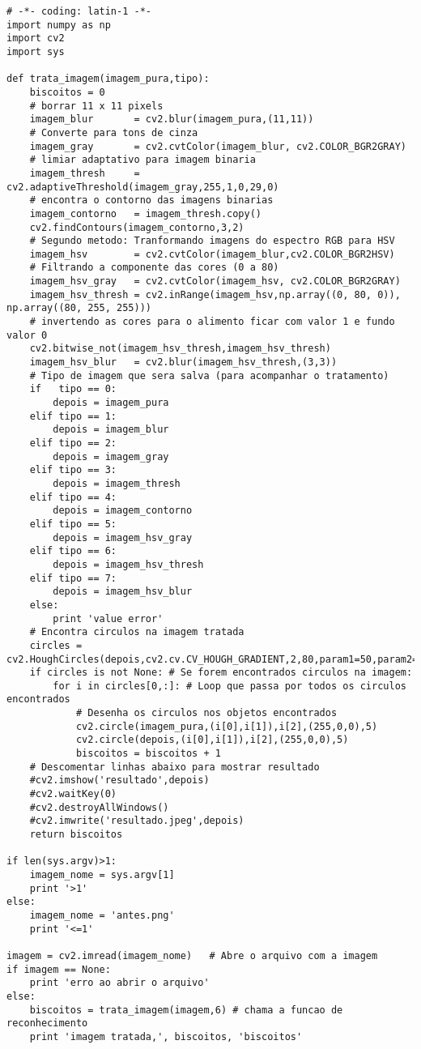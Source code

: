 \lstset{language=Python}
\begin{lstlisting}
# -*- coding: latin-1 -*-
import numpy as np
import cv2
import sys

def trata_imagem(imagem_pura,tipo):
    biscoitos = 0
    # borrar 11 x 11 pixels 
    imagem_blur       = cv2.blur(imagem_pura,(11,11)) 
    # Converte para tons de cinza
    imagem_gray       = cv2.cvtColor(imagem_blur, cv2.COLOR_BGR2GRAY) 
    # limiar adaptativo para imagem binaria
    imagem_thresh     = cv2.adaptiveThreshold(imagem_gray,255,1,0,29,0)
    # encontra o contorno das imagens binarias
    imagem_contorno   = imagem_thresh.copy()
    cv2.findContours(imagem_contorno,3,2)
    # Segundo metodo: Tranformando imagens do espectro RGB para HSV
    imagem_hsv        = cv2.cvtColor(imagem_blur,cv2.COLOR_BGR2HSV)
    # Filtrando a componente das cores (0 a 80)
    imagem_hsv_gray   = cv2.cvtColor(imagem_hsv, cv2.COLOR_BGR2GRAY)
    imagem_hsv_thresh = cv2.inRange(imagem_hsv,np.array((0, 80, 0)), np.array((80, 255, 255)))
    # invertendo as cores para o alimento ficar com valor 1 e fundo valor 0
    cv2.bitwise_not(imagem_hsv_thresh,imagem_hsv_thresh)
    imagem_hsv_blur   = cv2.blur(imagem_hsv_thresh,(3,3))
    # Tipo de imagem que sera salva (para acompanhar o tratamento)
    if   tipo == 0:
        depois = imagem_pura
    elif tipo == 1:
        depois = imagem_blur
    elif tipo == 2:
        depois = imagem_gray
    elif tipo == 3:
        depois = imagem_thresh
    elif tipo == 4:
        depois = imagem_contorno
    elif tipo == 5:
        depois = imagem_hsv_gray
    elif tipo == 6:
        depois = imagem_hsv_thresh
    elif tipo == 7:
        depois = imagem_hsv_blur 
    else:
        print 'value error'
    # Encontra circulos na imagem tratada
    circles = cv2.HoughCircles(depois,cv2.cv.CV_HOUGH_GRADIENT,2,80,param1=50,param2=35,minRadius=45,maxRadius=55)
    if circles is not None: # Se forem encontrados circulos na imagem:
        for i in circles[0,:]: # Loop que passa por todos os circulos encontrados
            # Desenha os circulos nos objetos encontrados
            cv2.circle(imagem_pura,(i[0],i[1]),i[2],(255,0,0),5)
            cv2.circle(depois,(i[0],i[1]),i[2],(255,0,0),5)
            biscoitos = biscoitos + 1
    # Descomentar linhas abaixo para mostrar resultado
    #cv2.imshow('resultado',depois)
    #cv2.waitKey(0)
    #cv2.destroyAllWindows()
    #cv2.imwrite('resultado.jpeg',depois)
    return biscoitos

if len(sys.argv)>1:
    imagem_nome = sys.argv[1]
    print '>1'
else:
    imagem_nome = 'antes.png'
    print '<=1'

imagem = cv2.imread(imagem_nome)   # Abre o arquivo com a imagem
if imagem == None:
    print 'erro ao abrir o arquivo'
else:
    biscoitos = trata_imagem(imagem,6) # chama a funcao de reconhecimento
    print 'imagem tratada,', biscoitos, 'biscoitos' 
\end{lstlisting}